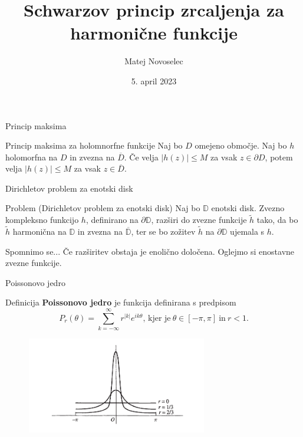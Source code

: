 \documentclass{beamer}
\title{Schwarzov princip zrcaljenja za harmonične funkcije}
\author{Matej Novoselec}
\institute[UL FMF]{FMF Fakulteta za matematiko in fiziko}
\date{5. april 2023}
\theoremstyle{definition}
\theoremstyle{definition}
\begin{document}
\begin{frame}
   \titlepage
\end{frame}
\begin{frame}{Princip maksima}
   \begin{alertblock}{Princip maksima za holomnorfne funkcije}
      Naj bo $D$ omejeno območje. Naj bo $h$ holomorfna na $D$ in zvezna na $\overline{D}$.
      Če velja $|h(z)| \leq M$ za vsak $z \in \partial D$, potem velja $|h(z)| \leq M$ za vsak $z \in \overline{D}$.
   \end{alertblock}  
\end{frame}
\begin{frame}{Dirichletov problem za enotski disk}
   \begin{alertblock}{Problem (Dirichletov problem za enotski disk)}
        Naj bo $\mathbb{D}$ enotski disk. Zvezno kompleksno funkcijo $h$, definirano na $\partial \mathbb{D}$, razširi do zvezne funkcije $\widetilde{h}$ tako, da bo $\widetilde{h}$ harmonična na $\mathbb{D}$ in zvezna na $\overline{\mathbb{D}}$, ter se bo zožitev $\widetilde{h}$ na $\partial \mathbb{D}$ ujemala s $h$.
   \end{alertblock}
   \begin{exampleblock}{Spomnimo se...}
    \pause
    Če razširitev obstaja je enolično določena.
    \pause
    \newline
    Oglejmo si enostavne zvezne funkcije.
   \end{exampleblock}
\end{frame}

\begin{frame}{Poissonovo jedro}
   \begin{block}{Definicija}
      \textbf{Poissonovo jedro} je funkcija definirana s predpisom
      $$
         P_r(\theta) = \sum_{k = -\infty}^{\infty}{r^{|k|} e^{i k \theta}}\text{, kjer je}~\theta \in [-\pi, \pi]~\text{in}~ r < 1.
      $$
   \end{block}
   \pause
   \begin{figure}
      \begin{center}
         \includegraphics[width=0.70\textwidth]{poissonkernel.png}
      \end{center}
   \end{figure}
\end{frame}
\end{document}
